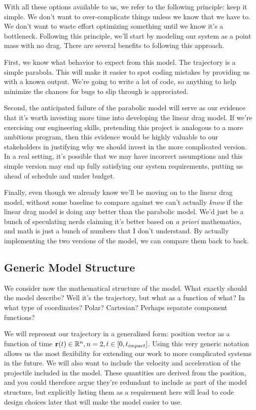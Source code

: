 With all these options available to us, we refer to the following principle: keep it simple. We don't want to over-complicate things unless we know that we have to. We don't want to waste effort optimizing something until we know it's a bottleneck. Following this principle, we'll start by modeling our system as a point mass with no drag. There are several benefits to following this approach. 

First, we know what behavior to expect from this model. The trajectory is a simple parabola. This will make it easier to spot coding mistakes by providing us with a known output. We're going to write a lot of code, so anything to help minimize the chances for bugs to slip through is appreciated. 

Second, the anticipated failure of the parabolic model will serve as our evidence that it's worth investing more time into developing the linear drag model. If we're exercising our engineering skills, pretending this project is analogous to a more ambitious program, then this evidence would be highly valuable to our stakeholders in justifying why we should invest in the more complicated version. In a real setting, it's possible that we may have incorrect assumptions and this simple version may end up fully satisfying our system requirements, putting us ahead of schedule and under budget.

Finally, even though we already know we'll be moving on to the linear drag model, without some baseline to compare against we can't actually \textit{know} if the linear drag model is doing any better than the parabolic model. We'd just be a bunch of speculating nerds claiming it's better based on \textit{a priori} mathematics, and math is just a bunch of numbers that I don't understand. By actually implementing the two versions of the model, we can compare them back to back. 

\subsection{Generic Model Structure}

We consider now the mathematical structure of the model. What exactly should the model describe? Well it's the trajectory, but what as a function of what? In what type of coordinates? Polar? Cartesian? Perhaps separate component functions?

We will represent our trajectory in a generalized form: position vector as a function of time ${\bf r}(t) \in \mathbb{R}^n, n = 2, t \in [0,t_{impact}]$. Using this very generic notation allows us the most flexibility for extending our work to more complicated systems in the future. We will also want to include the velocity and acceleration of the projectile included in the model. These quantities are derived from the position, and you could therefore argue they're redundant to include as part of the model structure, but explicitly listing them as a requirement here will lead to code design choices later that will make the model easier to use.

